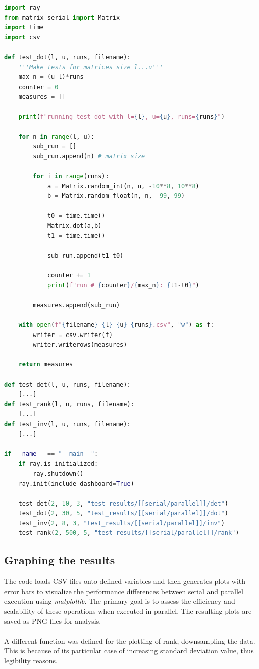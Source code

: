 \begin{lstlisting}[language=Python, label=main.py]
import ray
from matrix_serial import Matrix
import time
import csv
    
def test_dot(l, u, runs, filename):
    '''Make tests for matrices size l...u'''
    max_n = (u-l)*runs
    counter = 0
    measures = []
    
    print(f"running test_dot with l={l}, u={u}, runs={runs}")

    for n in range(l, u):
        sub_run = []
        sub_run.append(n) # matrix size

        for i in range(runs):
            a = Matrix.random_int(n, n, -10**8, 10**8)
            b = Matrix.random_float(n, n, -99, 99)

            t0 = time.time()
            Matrix.dot(a,b)
            t1 = time.time()

            sub_run.append(t1-t0)

            counter += 1
            print(f"run # {counter}/{max_n}: {t1-t0}")

        measures.append(sub_run)

    with open(f"{filename}_{l}_{u}_{runs}.csv", "w") as f:
        writer = csv.writer(f)
        writer.writerows(measures)

    return measures

def test_det(l, u, runs, filename):
    [...]
def test_rank(l, u, runs, filename):
    [...]
def test_inv(l, u, runs, filename):
    [...]

if __name__ == "__main__":
    if ray.is_initialized:
        ray.shutdown()
    ray.init(include_dashboard=True)

    test_det(2, 10, 3, "test_results/[[serial/parallel]]/det")
    test_dot(2, 30, 5, "test_results/[[serial/parallel]]/dot")
    test_inv(2, 8, 3, "test_results/[[serial/parallel]]/inv")
    test_rank(2, 500, 5, "test_results/[[serial/parallel]]/rank")
    \end{lstlisting}

\subsection{Graphing the results}
The code loads CSV files onto defined variables and then generates plots with error bars to visualize the performance differences between serial and parallel execution using \textit{matplotlib}. The primary goal is to assess the efficiency and scalability of these operations when executed in parallel. The resulting plots are saved as PNG files for analysis.
\\\\
A different function was defined for the plotting of rank, downsampling the data. This is because of its particular case of increasing standard deviation value, thus legibility reasons.

